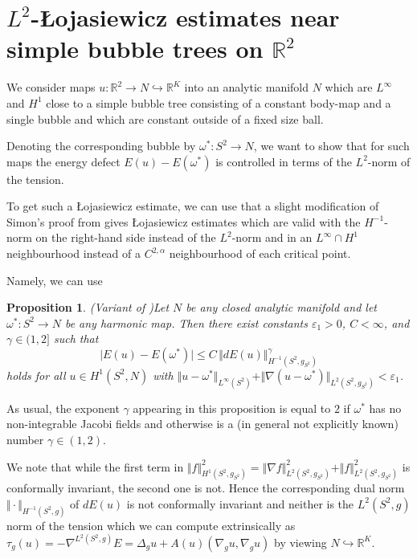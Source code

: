 \documentclass[10pt,reqno]{amsart}
\theoremstyle{plain}
\newtheorem{prop}[lemma]{Proposition}
\theoremstyle{definition}
\numberwithin{equation}{section}
\newcommand{\al}{\alpha}
\newcommand{\ga}{\gamma}
\newcommand{\om}{\omega}
\newcommand{\R}{\ensuremath{{\mathbb R}}}
\newcommand{\norm}[1]{\Vert#1\Vert}
\newcommand{\beq}{\begin{equation}}
\newcommand{\eeq}{\end{equation}}
\newcommand{\abs}[1]{\vert#1\vert}
\newcommand{\eps}{\varepsilon}
\newcommand{\na}{\nabla}
\begin{document}
\section{$L^2$-\L ojasiewicz estimates near simple bubble trees on $\mathbb{R}^2$}\label{sec:weightedestimates}


We consider maps
$ u : \mathbb{R}^2 \to N\hookrightarrow \R^K$ into 
an analytic manifold $N$
 which are $L^\infty$ and $H^1$ close to a simple bubble tree consisting of a constant body-map and a single bubble and which are constant outside of a fixed size ball. 
 
Denoting the corresponding bubble by $\omega^*:S^2\to N$, we want to show that for such maps the energy 
defect
$
E(u)-E(\omega^*)
$
is controlled in terms of the $L^2$-norm of the tension.


To get such a \L ojasiewicz estimate, we can use that a slight modification of Simon's proof from \cite{leonsimon} gives \L ojasiewicz estimates which are valid with the $H^{-1}$-norm on the right-hand side instead of the $L^2$-norm and in an $L^\infty \cap H^1$ neighbourhood instead of a $C^{2,\al}$ neighbourhood of each critical point.

Namely, we can use


\begin{prop}(Variant of \cite[Theorem $3$]{leonsimon})\label{prop:Loj-Simon}
Let $N$ be any closed analytic manifold and let
$\om^* : S^2 \to N$ be any harmonic map.
Then there exist constants $\eps_1>0$, $C<\infty$, and $\ga\in(1,2]$ such that
\beq\label{est:Loj-Simon}
\abs{E(u)-E(\om^*)}
\leq
C \, \norm{dE(u)}_{H^{-1}(S^2, g_{S^2})}^\ga
\eeq
holds for all $u\in H^1(S^2,N)$ with
$\norm{u-\om^*}_{L^\infty(S^2)}
+\norm{\na(u-\om^*)}_{L^2(S^2 , g_{S^2})}
<\eps_1$.
\end{prop}
As usual, the exponent $\ga$ appearing in this proposition is equal to $2$ if $\om^*$ has no
non-integrable Jacobi fields and otherwise is a (in general not explicitly
known) number $\ga\in (1,2)$. 


We note that while the first term in 
$
\norm{f}_{H^1(S^2, g_{S^2})}^2
=
\norm{\na f}_{L^2(S^2, g_{S^2})}^2
+
\norm{f}_{L^2(S^2, g_{S^2})}^2
$ is
conformally invariant, the second one is not. Hence the corresponding
dual norm $\norm{\cdot}_{H^{-1}(S^2, g)}$ of $dE(u)$ is not conformally invariant and neither is the $L^2(S^2,g)$ norm of the tension which we can compute extrinsically as $\tau_g(u)=-\na^{L^2(S^2,g)}E=\Delta_g u+A(u)(\na_gu,\na_g u)$ by viewing $N\hookrightarrow \R^K$. 
\end{document}

